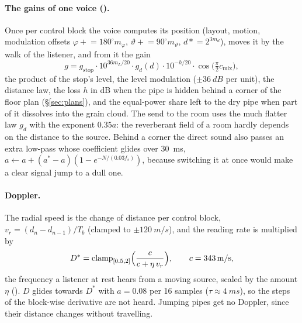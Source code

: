 \paragraph{The gains of one voice ().} Once per control block the voice computes its position
(layout, motion, modulation offsets $\varphi \mathrel{+}= 180^\circ m_\varphi$, $\vartheta \mathrel{+}= 90^\circ m_\vartheta$,
$d \mathrel{*}= 2^{3m_d}$), moves it by the walk of the listener, and from it the gain
\begin{equation}
  g = g_\mathrm{stop}\cdot 10^{36m_L/20}\cdot g_d(d)\cdot 10^{-h/20}\cdot\cos\bigl(\tfrac\pi2 c_\mathrm{mix}\bigr),
\end{equation}
the product of the stop's level, the level modulation ($\pm\SI{36}{dB}$ per unit), the distance law, the loss $h$ in
dB when the pipe is hidden behind a corner of the floor plan (\S\ref{sec:plans}), and the equal-power share left to
the dry pipe when part of it dissolves into the grain cloud. The send to the room uses the much flatter law $g_d$ with
the exponent $0.35a$: the reverberant field of a room hardly depends on the distance to the source. Behind a corner
the direct sound also passes an extra low-pass whose coefficient glides over \SI{30}{ms},
$a \leftarrow a + (a^* - a)(1 - e^{-N/(0.03f_s)})$, because switching it at once would make a clear signal jump to a
dull one.

\paragraph{Doppler.} The radial speed is the change of distance per control block,
$v_r = (d_n - d_{n-1})/T_b$ (clamped to $\pm\SI{120}{m/s}$), and the reading rate is multiplied by
\begin{equation}
  D^* = \operatorname{clamp}_{[0.5,2]}\Bigl(\frac{c}{c + \eta\,v_r}\Bigr),\qquad c = \SI{343}{m/s},
\end{equation}
the frequency a listener at rest hears from a moving source, scaled by the amount $\eta$ (). $D$ glides
towards $D^*$ with $a = 0.08$ per 16 samples ($\tau\approx\SI{4}{ms}$), so the steps of the block-wise derivative are
not heard. Jumping pipes get no Doppler, since their distance changes without travelling.

